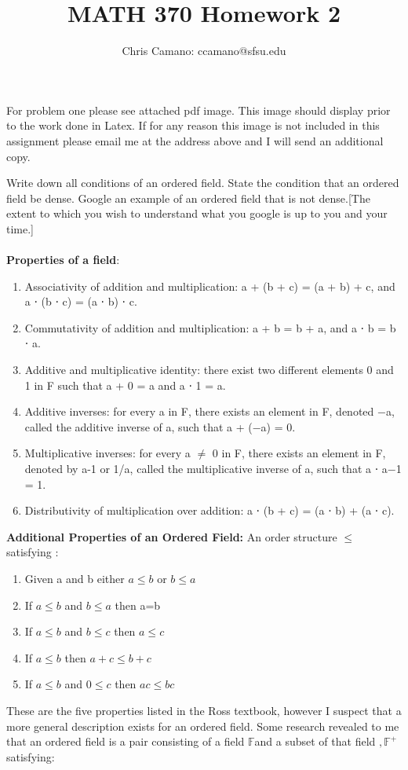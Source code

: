 \documentclass[11pt]{article}
\author{Chris Camano: ccamano@sfsu.edu}
\title{MATH 370  Homework 2 }
\date
\theoremstyle{definition}  %
\begin{document}
\maketitle
For problem one please see attached pdf image. This image should display prior to the work done in Latex. If for any reason this image is not included in this assignment please email me at the address above and I will send an additional copy.

Write down all conditions of an ordered field. State the condition that an
ordered field be dense. Google an example of an ordered field that is not
dense.[The extent to which you wish to understand what you google is up
to you and your time.]
\\\\
\textbf{Properties of a field}:
\begin{enumerate}
\item Associativity of addition and multiplication: a + (b + c) = (a + b) + c, and a ⋅ (b ⋅ c) = (a ⋅ b) ⋅ c.
\item Commutativity of addition and multiplication: a + b = b + a, and a ⋅ b = b ⋅ a.
\item Additive and multiplicative identity: there exist two different elements 0 and 1 in F such that a + 0 = a and a ⋅ 1 = a.
\item Additive inverses: for every a in F, there exists an element in F, denoted −a, called the additive inverse of a, such that a + (−a) = 0.
\item Multiplicative inverses: for every a $\neq$ 0 in F, there exists an element in F, denoted by a-1 or 1/a, called the multiplicative inverse of a, such that a ⋅ a−1 = 1.
\item Distributivity of multiplication over addition: a ⋅ (b + c) = (a ⋅ b) + (a ⋅ c).
\end{enumerate}
\textbf{Additional Properties of an Ordered Field:}
An order structure $\leq$  satisfying :
\begin{enumerate}
  \item Given a and b either $a \leq b$ or $b\leq a$
  \item If $a\leq b $ and $b \leq a $ then a=b
  \item If $a\leq b$ and $b \leq c$ then $a\leq c$
  \item If $a \leq b$ then $a+c\leq b+c$
  \item If $a \leq b$ and $0 \leq c$ then $ac \leq bc$
\end{enumerate}
These are the five properties listed in the Ross textbook, however I suspect that a more general description exists for an ordered field. Some research revealed to me that an ordered field is a pair consisting of a field $\mathbb{F}$and a subset of that field $,\mathbb{F}^+$ satisfying:
\end{document}
